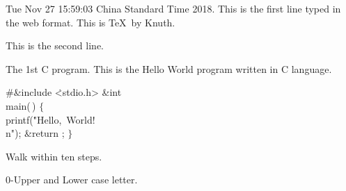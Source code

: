 
\datethis

Tue Nov 27 15:59:03 China Standard Time 2018.
This is the first line typed in the web format. This is \TeX\ by Knuth.

This is the second line.

\smallskip{}

\fi

The 1st C program. This is the Hello World program written in C language.

\Y\B\8\#\&{include} \.{<stdio.h>}\7
\&{int} \\{main}(\,)\1\1\2\2\6
${}\{{}$\1\6
\\{printf}(\.{"Hello,\ World!\ \\n"});\6
\&{return} ;\6
\4${}\}{}$\2\par
\fi

Walk within ten steps.
\smallskip{}

\fi

0-Upper and Lower case letter.

